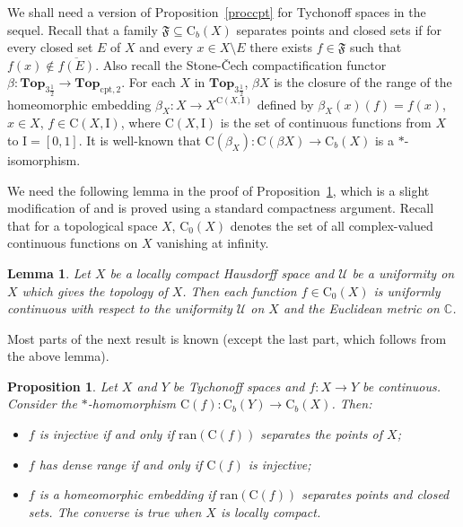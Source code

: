 \documentclass[manuscript]{amsart}
\newtheorem{lemma}[theorem]{Lemma}
\newtheorem{proposition}[theorem]{Proposition}
\theoremstyle{definition}
\begin{document}
We shall need a version of Proposition~\ref{proccpt} for Tychonoff spaces in the sequel.
Recall that a family
$\mathfrak{F}\subseteq \mathrm{C}_{b}(X)$  separates points and
closed sets if for every closed set $E$ of $X$ and every $x\in X\setminus E$
there exists $f\in \mathfrak{F}$ such that $f(x)\not\in \overline{f(E)}$.
Also recall the Stone-\v{C}ech compactification functor
$\beta : \mathbf{Top}_{3\frac{1}{2}}\to \mathbf{Top}_{\mathrm{cpt,2}}$.
For each $X$ in $\mathbf{Top}_{3\frac{1}{2}}$,
$\beta X$ is the closure of the range of the homeomorphic embedding
$\beta_{X}:X\to X^{\mathrm{C}(X,\mathrm{I})}$ defined by
$\beta_{X}(x)(f)=f(x)$, $x\in X$, $f\in \mathrm{C}(X,\mathrm{I})$, where
$\mathrm{C}(X,\mathrm{I})$ is the set of continuous functions from $X$ to
$\mathrm{I}=[0,1]$.
 It is well-known that
$\mathrm{C}(\beta_{X}): \mathrm{C}(\beta X)\to \mathrm{C}_{b}(X)$ is a $*$-isomorphism.

We need the following lemma in the proof of Proposition~\ref{propcty}, which is a slight modification of
\cite[Proposition~2.6]{fo95} and is proved using a standard compactness argument. Recall that
for a topological space $X$, $\mathrm{C}_{0}(X)$ denotes the set of all complex-valued
continuous functions on $X$  vanishing at infinity.
\begin{lemma}\label{lemuni}
Let $X$ be a locally compact Hausdorff space and $\mathcal{U}$ be a uniformity
on $X$
which gives the topology of $X$. Then each function $f\in \mathrm{C}_{0}(X)$
is uniformly continuous with respect to the uniformity $\mathcal{U}$ on $X$ and the Euclidean
metric on $\mathbb{C}$.
\end{lemma}

Most parts of the next result is known (except the last part, which follows from the above lemma).

\begin{proposition}\label{propcty}
Let $X$ and $Y$ be Tychonoff spaces and $f:X\to Y$ be  continuous.
Consider the $*$-homomorphism $\mathrm{C}(f): \mathrm{C}_{b}(Y)\to \mathrm{C}_{b}(X)$.
Then:
\begin{itemize}
\item[(1)]
$f$ is injective if and only if $\mathrm{ran}(\mathrm{C}(f))$ separates the points of $X$;
\item[(2)]
$f$ has dense range if and only if $\mathrm{C}(f)$ is injective;
\item[(3)]
$f$ is a homeomorphic embedding if
$\mathrm{ran}(\mathrm{C}(f))$ separates  points and closed sets.
The converse is true when $X$ is locally compact.
\end{itemize}
\end{proposition}
\end{document}
